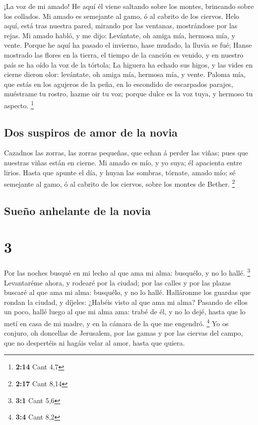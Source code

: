 ¡La voz de mi amado! He aquí él viene saltando sobre los
montes, brincando sobre los collados.  Mi amado es semejante
al gamo, ó al cabrito de los ciervos. Helo aquí, está tras nuestra
pared, mirando por las ventanas, mostrándose por las rejas.
 Mi amado habló, y me dijo: Levántate, oh amiga mía,
hermosa mía, y vente.  Porque he aquí ha pasado el
invierno, hase mudado, la lluvia se fué;  Hanse mostrado
las flores en la tierra, el tiempo de la canción es venido, y en nuestro
país se ha oído la voz de la tórtola;  La higuera ha echado
sus higos, y las vides en cierne dieron olor: levántate, oh amiga mía,
hermosa mía, y vente.  Paloma mía, que estás en los
agujeros de la peña, en lo escondido de escarpados parajes, muéstrame tu
rostro, hazme oir tu voz; porque dulce es la voz tuya, y hermoso tu
aspecto. \footnote{\textbf{2:14} Cant 4,7}

\hypertarget{dos-suspiros-de-amor-de-la-novia}{%
\subsection{Dos suspiros de amor de la
novia}\label{dos-suspiros-de-amor-de-la-novia}}

 Cazadnos las zorras, las zorras pequeñas, que echan á
perder las viñas; pues que nuestras viñas están en cierne. 
Mi amado es mío, y yo suya; él apacienta entre lirios. 
Hasta que apunte el día, y huyan las sombras, tórnate, amado mío; sé
semejante al gamo, ó al cabrito de los ciervos, sobre los montes de
Bether. \footnote{\textbf{2:17} Cant 8,14}

\hypertarget{sueuxf1o-anhelante-de-la-novia}{%
\subsection{Sueño anhelante de la
novia}\label{sueuxf1o-anhelante-de-la-novia}}

\hypertarget{section-2}{%
\section{3}\label{section-2}}

 Por las noches busqué en mi lecho al que ama mi alma:
busquélo, y no lo hallé. \footnote{\textbf{3:1} Cant 5,6} 
Levantaréme ahora, y rodearé por la ciudad; por las calles y por las
plazas buscaré al que ama mi alma: busquélo, y no lo hallé. 
Halláronme los guardas que rondan la ciudad, y díjeles: ¿Habéis visto al
que ama mi alma?  Pasando de ellos un poco, hallé luego al
que mi alma ama: trabé de él, y no lo dejé, hasta que lo metí en casa de
mi madre, y en la cámara de la que me engendró. \footnote{\textbf{3:4}
  Cant 8,2}  Yo os conjuro, oh doncellas de Jerusalem, por
las gamas y por las ciervas del campo, que no despertéis ni hagáis velar
al amor, hasta que quiera.

